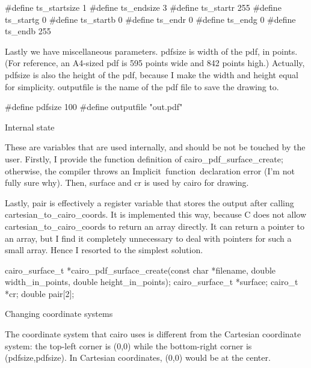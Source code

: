 \documentclass{article}%
\def\heading#1{\noindent\bigbf #1 \rm\par\smallskip}
\begin{document}
\nwenddocs{}\plusendmoddef\nwstartdeflinemarkup\nwenddeflinemarkup
#define ts_startsize 1
#define ts_endsize 3
#define ts_startr 255
#define ts_startg 0
#define ts_startb 0
#define ts_endr 0
#define ts_endg 0
#define ts_endb 255

\nwendcode{}Lastly we have miscellaneous parameters. {\Tt{}pdfsize\nwendquote} is width of the pdf, in points. (For reference, an A4-sized pdf is 595 points wide and 842 points high.) Actually, {\Tt{}pdfsize\nwendquote} is also the height of the pdf, because I make the width and height equal for simplicity. {\Tt{}outputfile\nwendquote} is the name of the pdf file to save the drawing to.

\nwenddocs{}\endmoddef\nwstartdeflinemarkup\nwenddeflinemarkup
#define pdfsize 100
#define outputfile "out.pdf"

\nwendcode{}\heading{Internal state}
These are variables that are used internally, and should be not be touched by the user. Firstly, I provide the function definition of {\Tt{}cairo{\_}pdf{\_}surface{\_}create\nwendquote}; otherwise, the compiler throws an {\Tt{}Implicit\ function\ declaration\nwendquote} error (I'm not fully sure why). Then, {\Tt{}surface\nwendquote} and {\Tt{}cr\nwendquote} is used by {\Tt{}cairo\nwendquote} for drawing.

Lastly, {\Tt{}pair\nwendquote} is effectively a register variable that stores the output after calling {\Tt{}cartesian{\_}to{\_}cairo{\_}coords\nwendquote}. It is implemented this way, because C does not allow {\Tt{}cartesian{\_}to{\_}cairo{\_}coords\nwendquote} to return an array directly. It can return a pointer to an array, but I find it completely unnecessary to deal with pointers for such a small array. Hence I resorted to the simplest solution.

\nwenddocs{}\endmoddef\nwstartdeflinemarkup\nwenddeflinemarkup
cairo_surface_t *cairo_pdf_surface_create(const char *filename,
        double width_in_points, double height_in_points);
cairo_surface_t *surface;
cairo_t *cr;
double pair[2];

\nwendcode{}\heading{Changing coordinate systems}
The coordinate system that {\Tt{}cairo\nwendquote} uses is different from the Cartesian coordinate system: the top-left corner is {\Tt{}(0,0)\nwendquote} while the bottom-right corner is {\Tt{}(pdfsize,pdfsize)\nwendquote}. In Cartesian coordinates, {\Tt{}(0,0)\nwendquote} would be at the center.
\end{document}
